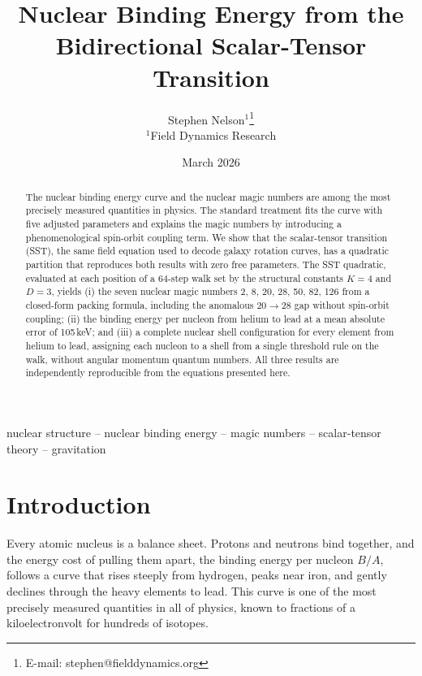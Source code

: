 \documentclass[fleqn,usenatbib]{mnras}
\title{Nuclear Binding Energy from the Bidirectional Scalar-Tensor Transition}
\author[S. Nelson]{Stephen Nelson$^{1}$\thanks{E-mail: stephen@fielddynamics.org}\\
$^{1}$Field Dynamics Research}
\date{March 2026}
\begin{document}
\maketitle

\begin{abstract}
The nuclear binding energy curve and the nuclear magic numbers are among the most precisely measured quantities in physics. The standard treatment fits the curve with five adjusted parameters and explains the magic numbers by introducing a phenomenological spin-orbit coupling term. We show that the scalar-tensor transition (SST), the same field equation used to decode galaxy rotation curves, has a quadratic partition that reproduces both results with zero free parameters. The SST quadratic, evaluated at each position of a 64-step walk set by the structural constants $K\!=\!4$ and $D\!=\!3$, yields (i) the seven nuclear magic numbers 2, 8, 20, 28, 50, 82, 126 from a closed-form packing formula, including the anomalous $20\!\to\!28$ gap without spin-orbit coupling; (ii) the binding energy per nucleon from helium to lead at a mean absolute error of 105\,keV; and (iii) a complete nuclear shell configuration for every element from helium to lead, assigning each nucleon to a shell from a single threshold rule on the walk, without angular momentum quantum numbers. All three results are independently reproducible from the equations presented here.
\end{abstract}

\begin{keywords}
nuclear structure -- nuclear binding energy -- magic numbers -- scalar-tensor theory -- gravitation
\end{keywords}

\section{Introduction}
\label{sec:intro}

Every atomic nucleus is a balance sheet. Protons and neutrons bind together, and the energy cost of pulling them apart, the binding energy per nucleon $B/A$, follows a curve that rises steeply from hydrogen, peaks near iron, and gently declines through the heavy elements to lead. This curve is one of the most precisely measured quantities in all of physics, known to fractions of a kiloelectronvolt for hundreds of isotopes.
\end{document}
